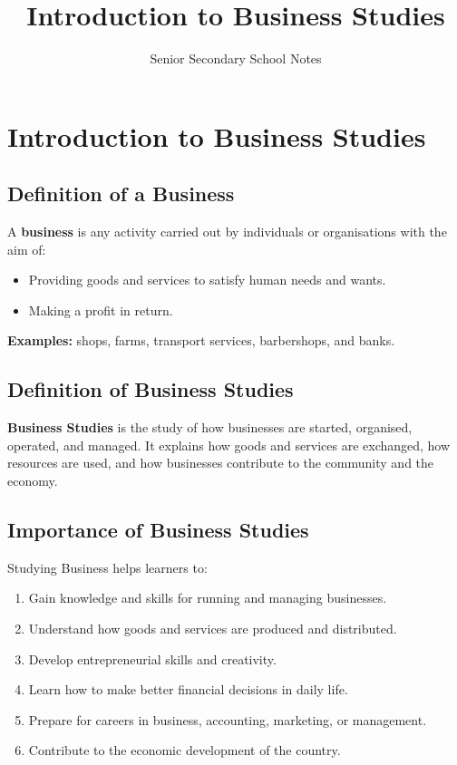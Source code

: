 \documentclass[12pt,a4paper, openany]{book}
\title{Introduction to Business Studies}
\author{Senior Secondary School Notes}
\date{}
\begin{document}
\maketitle

\chapter*{Introduction to Business Studies}

\section{Definition of a Business}
A \textbf{business} is any activity carried out by individuals or organisations with the aim of:
\begin{itemize}
	\item Providing goods and services to satisfy human needs and wants.
	\item Making a profit in return.
\end{itemize}

\textbf{Examples:} shops, farms, transport services, barbershops, and banks.

\section{Definition of Business Studies}
\textbf{Business Studies} is the study of how businesses are started, organised, operated, and managed.
It explains how goods and services are exchanged, how resources are used, and how businesses contribute to the community and the economy.

\section{Importance of Business Studies}
Studying Business helps learners to:
\begin{enumerate}
	\item Gain knowledge and skills for running and managing businesses.
	\item Understand how goods and services are produced and distributed.
	\item Develop entrepreneurial skills and creativity.
	\item Learn how to make better financial decisions in daily life.
	\item Prepare for careers in business, accounting, marketing, or management.
	\item Contribute to the economic development of the country.
\end{enumerate}
\end{document}
